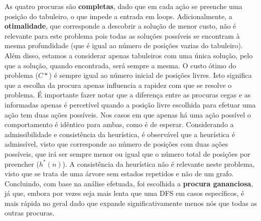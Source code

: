 \documentclass[12pt,a4paper]{article}
\begin{document}
As quatro procuras são \textbf{completas}, dado que em cada ação se preenche uma posição do tabuleiro,
o que impede a entrada em loops.
Adicionalmente, a \textbf{otimalidade}, que corresponde a descobrir a solução de menor custo,
não é relevante para este problema pois todas as soluções possíveis se encontram à mesma profundidade
(que é igual ao número de posições vazias do tabuleiro).
Além disso, estamos a considerar apenas tabuleiros com uma única solução,
pelo que a solução, quando encontrada, será sempre a mesma.
O custo ótimo do problema (\(C*\)) é sempre igual ao número inicial de posições livres.
Isto significa que a escolha da procura apenas influencia a rapidez com que se resolve o problema.
É importante fazer notar que a diferença entre as procuras cegas e as informadas
apenas é percetível quando a posição livre escolhida para efetuar uma ação tem duas ações possíveis.
Nos casos em que apenas há uma ação possível o comportamento é idêntico para ambas, como é de esperar.
Considerando a admissibilidade e consistência da heurística, é observável que
a heurística é admissível, visto que corresponde ao número de posições com duas ações possíveis, que
irá ser sempre menor ou igual que o número total de posições por preencher (\(h^*(n)\)).
A consistência da heurística não é relevante neste problema, visto que se trata de uma árvore sem estados repetidos e não
de um grafo.
Concluindo, com base na análise efetuada, foi escolhida a \textbf{procura gananciosa}, já que,
embora por vezes seja mais lenta que uma DFS em casos específicos, é mais rápida no geral dado
que expande significativamente menos nós que todas as outras procuras.
\end{document}
